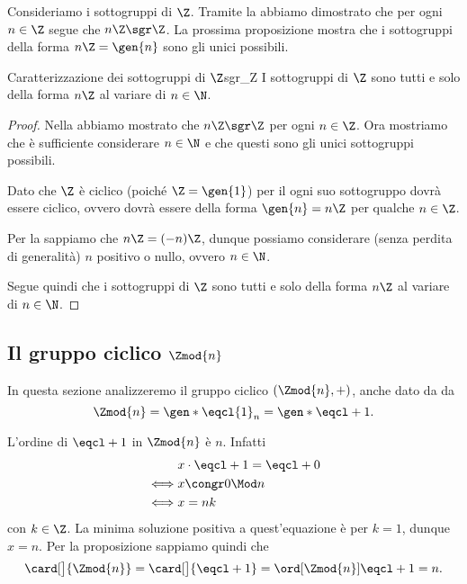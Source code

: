Consideriamo i sottogruppi di $\Z$. Tramite la  abbiamo dimostrato che per ogni $n \in \Z$ segue che $n\Z \sgr \Z$. La prossima proposizione mostra che i sottogruppi della forma $n\Z = \gen{n}$ sono gli unici possibili.

\begin{proposition}
    {Caratterizzazione dei sottogruppi di $\Z$}{sgr_Z}
    I sottogruppi di $\Z$ sono tutti e solo della forma $n\Z$ al variare di $n \in \N$.
\end{proposition}
\begin{proof}
    Nella  abbiamo mostrato che $n\Z \sgr \Z$ per ogni $n \in \Z$. Ora mostriamo che è sufficiente considerare $n \in \N$ e che questi sono gli unici sottogruppi possibili.

    Dato che $\Z$ è ciclico (poiché $\Z = \gen{1}$) per il  ogni suo sottogruppo dovrà essere ciclico, ovvero dovrà essere della forma $\gen{n} = n\Z$ per qualche $n \in \Z$.

    Per la  sappiamo che $n\Z = (-n)\Z$, dunque possiamo considerare (senza perdita di generalità) $n$ positivo o nullo, ovvero $n \in \N$.

    Segue quindi che i sottogruppi di $\Z$ sono tutti e solo della forma $n\Z$ al variare di $n \in \N$.
\end{proof}


\subsection{Il gruppo ciclico $\Zmod{n}$}

In questa sezione analizzeremo il gruppo ciclico $(\Zmod{n}, +)$, anche dato da da \[
    \Zmod{n} = \gen*{\eqcl{1}_{n}} = \gen*{\eqcl+ 1}.
\]

L'ordine di $\eqcl+ 1$ in $\Zmod{n}$ è $n$. Infatti \begin{align*}
    &x\cdot \eqcl+ 1 = \eqcl+ 0\\
    \iff &x \congr 0 \Mod n \\
    \iff &x = nk
\end{align*}
con $k \in \Z$. 
La minima soluzione positiva a quest'equazione è per $k = 1$, dunque $x = n$. 
Per la proposizione  sappiamo quindi che \begin{equation} \label{eq:card_Z/nZ}
    \card[\big]{\Zmod{n}} = \card[\big]{\eqcl+ 1} = \ord[\Zmod{n}]{\eqcl+ 1} = n.
\end{equation}

